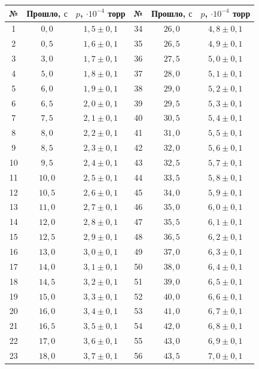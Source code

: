 \documentclass[a4paper,11pt]{article}
\begin{document}
\begin{table}[h!]
\centering
\begin{tabular}{ ||c|c|c||c|c|c|| }
  \hline
  № & Прошло, $с$ & $p$, $ \cdot 10^{-4}$ торр & № & Прошло, $с$ & $p$, $ \cdot 10^{-4}$ торр \\
  \hline
  1 & $0,0$ & $1,5 \pm 0,1$ & 34 & $26,0$ & $4,8 \pm 0,1$ \\
  2 & $0,5$ & $1,6 \pm 0,1$ & 35 & $26,5$ & $4,9 \pm 0,1$ \\
  3 & $3,0$ & $1,7 \pm 0,1$ & 36 & $27,5$ & $5,0 \pm 0,1$ \\
  4 & $5,0$ & $1,8 \pm 0,1$ & 37 & $28,0$ & $5,1 \pm 0,1$ \\
  5 & $6,0$ & $1,9 \pm 0,1$ & 38 & $29,0$ & $5,2 \pm 0,1$ \\
  6 & $6,5$ & $2,0 \pm 0,1$ & 39 & $29,5$ & $5,3 \pm 0,1$ \\
  7 & $7,5$ & $2,1 \pm 0,1$ & 40 & $30,5$ & $5,4 \pm 0,1$ \\
  8 & $8,0$ & $2,2 \pm 0,1$ & 41 & $31,0$ & $5,5 \pm 0,1$ \\
  9 & $8,5$ & $2,3 \pm 0,1$ & 42 & $32,0$ & $5,6 \pm 0,1$ \\
  10 & $9,5$ & $2,4 \pm 0,1$ & 43 & $32,5$ & $5,7 \pm 0,1$ \\
  11 & $10,0$ & $2,5 \pm 0,1$ & 44 & $33,5$ & $5,8 \pm 0,1$ \\
  12 & $10,5$ & $2,6 \pm 0,1$ & 45 & $34,0$ & $5,9 \pm 0,1$ \\
  13 & $11,0$ & $2,7 \pm 0,1$ & 46 & $35,0$ & $6,0 \pm 0,1$ \\
  14 & $12,0$ & $2,8 \pm 0,1$ & 47 & $35,5$ & $6,1 \pm 0,1$ \\
  15 & $12,5$ & $2,9 \pm 0,1$ & 48 & $36,5$ & $6,2 \pm 0,1$ \\
  16 & $13,0$ & $3,0 \pm 0,1$ & 49 & $37,0$ & $6,3 \pm 0,1$ \\
  17 & $14,0$ & $3,1 \pm 0,1$ & 50 & $38,0$ & $6,4 \pm 0,1$ \\
  18 & $14,5$ & $3,2 \pm 0,1$ & 51 & $39,0$ & $6,5 \pm 0,1$ \\
  19 & $15,0$ & $3,3 \pm 0,1$ & 52 & $40,0$ & $6,6 \pm 0,1$ \\
  20 & $16,0$ & $3,4 \pm 0,1$ & 53 & $41,0$ & $6,7 \pm 0,1$ \\
  21 & $16,5$ & $3,5 \pm 0,1$ & 54 & $42,0$ & $6,8 \pm 0,1$ \\
  22 & $17,0$ & $3,6 \pm 0,1$ & 55 & $43,0$ & $6,9 \pm 0,1$ \\
  23 & $18,0$ & $3,7 \pm 0,1$ & 56 & $43,5$ & $7,0 \pm 0,1$ \\

\end{tabular}
\end{table}
\end{document}
